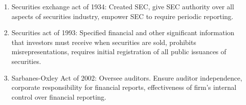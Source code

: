 \begin{remark} 
\begin{enumerate}[label=\roman*.]
\setlength{\itemsep}{0pt}
\item Securities exchange act of 1934: Created SEC, give SEC authority over all aspects of securities industry, empower SEC to require periodic reporting.
\item Securities act of 1993: Specified financial and other significant information that investors must receive when securities are sold, prohibits misrepresentations, requires initial registration of all public issuances of securities.
\item Sarbanes-Oxley Act of 2002: Oversee auditors. Ensure auditor independence, corporate responsibility for financial reports, effectiveness of firm’s internal control over financial reporting.
\end{enumerate}
\end{remark}

